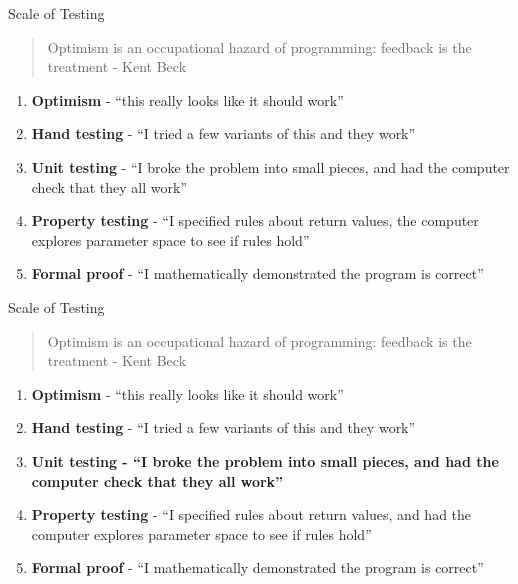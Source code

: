 \begin{frame}{Scale of Testing}

\begin{quote}
Optimism is an occupational hazard of programming: feedback is the
treatment - Kent Beck
\end{quote}

\begin{enumerate}
\def\labelenumi{\arabic{enumi}.}
\tightlist
\item
  \textbf{Optimism} - ``this really looks like it should work''
\item
  \textbf{Hand testing} - ``I tried a few variants of this and they
  work''
\item
  \textbf{Unit testing} - ``I broke the problem into small pieces, and
  had the computer check that they all work''
\item
  \textbf{Property testing} - ``I specified rules about return values,
  the computer explores parameter space to see if rules hold''
\item
  \textbf{Formal proof} - ``I mathematically demonstrated the program is
  correct''
\end{enumerate}

\end{frame}

\begin{frame}{Scale of Testing}

\begin{quote}
Optimism is an occupational hazard of programming: feedback is the
treatment - Kent Beck
\end{quote}

\begin{enumerate}
\def\labelenumi{\arabic{enumi}.}
\tightlist
\item
  \textbf{Optimism} - ``this really looks like it should work''
\item
  \textbf{Hand testing} - ``I tried a few variants of this and they
  work''
\item
  \textbf{Unit testing - ``I broke the problem into small pieces, and
  had the computer check that they all work''}
\item
  \textbf{Property testing} - ``I specified rules about return values,
  and had the computer explores parameter space to see if rules hold''
\item
  \textbf{Formal proof} - ``I mathematically demonstrated the program is
  correct''
\end{enumerate}

\end{frame}


